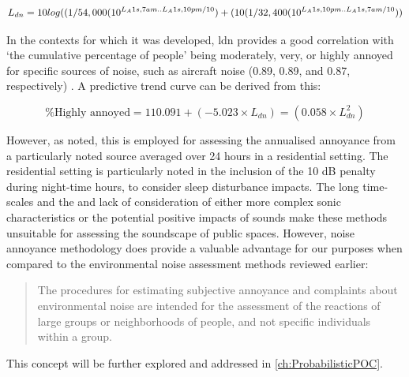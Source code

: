 \begin{dmath}
  L_{dn} = 10 log((1/54,000 (10^{L_{A}1s,7am..L_A1s,10pm/10})\\ + (10(1/32,400 (10^{L_A1s,10pm..L_A1s,7am/10}))
\end{dmath}


In the contexts for which it was developed, \gls{ldn} provides a good correlation with `the cumulative percentage of people' being moderately, very, or highly annoyed for specific sources of noise, such as aircraft noise (0.89, 0.89, and 0.87, respectively) \citep{Kryter1994}. A predictive trend curve can be derived from this:

\begin{equation}
\% \text{Highly annoyed} = 110.091 + (-5.023 \times L_{dn}) = (0.058 \times L_{dn}^2)
\end{equation}

However, as noted, this is employed for assessing the annualised annoyance from a particularly noted source averaged over 24 hours in a residential setting. The residential setting is particularly noted in the inclusion of the 10 dB penalty during night-time hours, to consider sleep disturbance impacts. The long time-scales and the and lack of consideration of either more complex sonic characteristics or the potential positive impacts of sounds make these methods unsuitable for assessing the soundscape of public spaces. However, noise annoyance methodology does provide a valuable advantage for our purposes when compared to the environmental noise assessment methods reviewed earlier:

\begin{quote}
  The procedures for estimating subjective annoyance and complaints about environmental noise are intended for the assessment of the reactions of large groups or neighborhoods of people, and not specific individuals within a group.
  \begin{flushright}
    \citet[pg. 571]{Kryter1994}
  \end{flushright}
\end{quote}

This concept will be further explored and addressed in \cref{ch:ProbabilisticPOC}.


